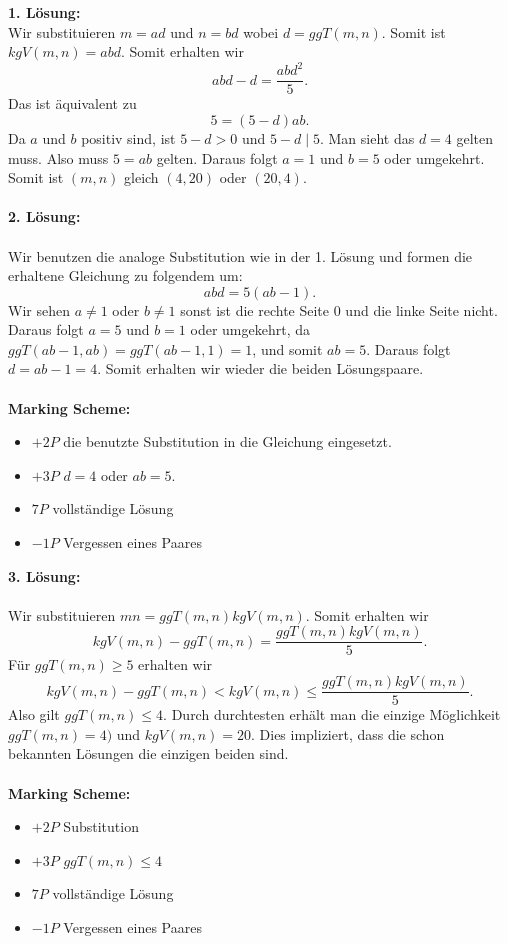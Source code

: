 \documentclass[language=german,style=solution]{smo}
\begin{document}
\begin{enumerate}
\textbf{1. Lösung:}
\\
Wir substituieren $m = ad$ und $n=bd$ wobei $d = ggT(m,n)$. Somit ist $kgV(m,n) = abd$. Somit erhalten wir
\[
abd - d = \frac{abd^{2}}{5}.
\]
Das ist äquivalent zu
\[
5 = (5-d)ab.
\] 
Da $a$ und $b$ positiv sind, ist $5-d > 0$ und $5-d \mid 5$. Man sieht das $d = 4$ gelten muss. Also muss $ 5 = ab$ gelten. Daraus folgt $a = 1$ und $b = 5$ oder umgekehrt. Somit ist $(m,n)$ gleich $(4,20)$ oder $(20,4)$.
\\
\\
\textbf{2. Lösung:}
\\
\\
Wir benutzen die analoge Substitution wie in der 1. L\"{o}sung und formen die erhaltene Gleichung zu folgendem um:
\[
abd = 5(ab-1).
\]
Wir sehen $a \neq 1$ oder $b \neq 1$ sonst ist die rechte Seite $0$ und die linke Seite nicht. Daraus folgt $a = 5$ und $b = 1$ oder umgekehrt, da $ggT(ab-1,ab) = ggT(ab-1,1) = 1$, und somit $ab = 5$. Daraus folgt $d = ab -1 = 4$. Somit erhalten wir wieder die beiden L\"{o}sungspaare. 
\\
\\
\textbf{Marking Scheme:} 
\begin{itemize}
\item $+2P$ die benutzte Substitution in die Gleichung eingesetzt. 
\item $+3P$ $d=4$ oder $ab=5$.
\item $7P$ vollständige Lösung
\item $-1P$ Vergessen eines Paares
\end{itemize}
\textbf{3. L\"{o}sung:}
\\
\\
Wir substituieren $mn = ggT(m,n)kgV(m,n)$. Somit erhalten wir
\[
kgV(m,n) - ggT(m,n) = \frac{ggT(m,n)kgV(m,n)}{5}.
\]
F\"{u}r $ggT(m,n) \geq 5$ erhalten wir
\[
kgV(m,n) - ggT(m,n) < kgV(m,n) \leq \frac{ggT(m,n)kgV(m,n)}{5}.
\]
Also gilt $ggT(m,n) \leq 4$. Durch durchtesten erhält man die einzige Möglichkeit $ggT(m,n) = 4)$ und $kgV(m,n) = 20$. Dies impliziert, dass die schon bekannten Lösungen die einzigen beiden sind.
\\
\\
\textbf{Marking Scheme:} 
\begin{itemize}
\item $+2P$ Substitution 
\item $+3P$ $ggT(m,n) \leq 4$ 
\item $7P$ vollständige Lösung
\item $-1P$ Vergessen eines Paares
\end{itemize}


\end{enumerate}
\end{document}
